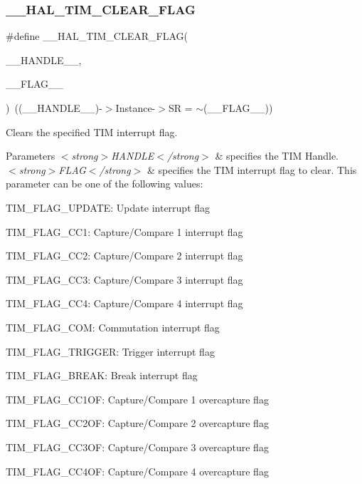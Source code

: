 \subsubsection{\texorpdfstring{\+\_\+\+\_\+\+H\+A\+L\+\_\+\+T\+I\+M\+\_\+\+C\+L\+E\+A\+R\+\_\+\+F\+L\+AG}{\_\_HAL\_TIM\_CLEAR\_FLAG}}
{\footnotesize\ttfamily \#define \+\_\+\+\_\+\+H\+A\+L\+\_\+\+T\+I\+M\+\_\+\+C\+L\+E\+A\+R\+\_\+\+F\+L\+AG(\begin{DoxyParamCaption}\item[{}]{\+\_\+\+\_\+\+H\+A\+N\+D\+L\+E\+\_\+\+\_\+,  }\item[{}]{\+\_\+\+\_\+\+F\+L\+A\+G\+\_\+\+\_\+ }\end{DoxyParamCaption})~((\+\_\+\+\_\+\+H\+A\+N\+D\+L\+E\+\_\+\+\_\+)-\/$>$Instance-\/$>$SR = $\sim$(\+\_\+\+\_\+\+F\+L\+A\+G\+\_\+\+\_\+))}



Clears the specified T\+IM interrupt flag. 


\begin{DoxyParams}{Parameters}
{\em $<$strong$>$\+H\+A\+N\+D\+L\+E$<$/strong$>$} & specifies the T\+IM Handle. \\
\hline
{\em $<$strong$>$\+F\+L\+A\+G$<$/strong$>$} & specifies the T\+IM interrupt flag to clear. This parameter can be one of the following values\+: \begin{DoxyItemize}
\item T\+I\+M\+\_\+\+F\+L\+A\+G\+\_\+\+U\+P\+D\+A\+TE\+: Update interrupt flag \item T\+I\+M\+\_\+\+F\+L\+A\+G\+\_\+\+C\+C1\+: Capture/\+Compare 1 interrupt flag \item T\+I\+M\+\_\+\+F\+L\+A\+G\+\_\+\+C\+C2\+: Capture/\+Compare 2 interrupt flag \item T\+I\+M\+\_\+\+F\+L\+A\+G\+\_\+\+C\+C3\+: Capture/\+Compare 3 interrupt flag \item T\+I\+M\+\_\+\+F\+L\+A\+G\+\_\+\+C\+C4\+: Capture/\+Compare 4 interrupt flag \item T\+I\+M\+\_\+\+F\+L\+A\+G\+\_\+\+C\+OM\+: Commutation interrupt flag \item T\+I\+M\+\_\+\+F\+L\+A\+G\+\_\+\+T\+R\+I\+G\+G\+ER\+: Trigger interrupt flag \item T\+I\+M\+\_\+\+F\+L\+A\+G\+\_\+\+B\+R\+E\+AK\+: Break interrupt flag \item T\+I\+M\+\_\+\+F\+L\+A\+G\+\_\+\+C\+C1\+OF\+: Capture/\+Compare 1 overcapture flag \item T\+I\+M\+\_\+\+F\+L\+A\+G\+\_\+\+C\+C2\+OF\+: Capture/\+Compare 2 overcapture flag \item T\+I\+M\+\_\+\+F\+L\+A\+G\+\_\+\+C\+C3\+OF\+: Capture/\+Compare 3 overcapture flag \item T\+I\+M\+\_\+\+F\+L\+A\+G\+\_\+\+C\+C4\+OF\+: Capture/\+Compare 4 overcapture flag \end{DoxyItemize}
\\
\hline
\end{DoxyParams}

